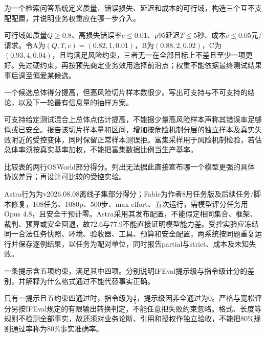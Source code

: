 \begin{exercises}
\begin{exercise}\optional 为一个检索问答系统定义质量、错误损失、延迟和成本的可行域，构造三个互不支配配置，并说明业务权重应在哪一步介入。

\begin{solution}
可行域如质量$Q\ge0.8$、高损失错误率$e\le0.01$、p95延迟$T\le5$秒、成本$c\le0.05$元/请求。令A为$(Q,T,c)=(0.82,1,0.01)$，B为$(0.88,2,0.02)$，C为$(0.93,4,0.04)$，且均满足风险约束，三者无一在全部目标上不差且至少一项更好。先过硬约束，再按预先商定业务效用选择前沿点；权重不能依据最终测试结果事后调至偏爱某候选。
\end{solution}
\end{exercise}

\begin{exercise} 一个候选总体得分提高，但高风险切片样本数很少。写出可支持与不可支持的结论，以及下一轮最有信息量的抽样方案。

\begin{solution}
可支持给定测试混合上总体点估计提高，不能据少量高风险样本声称其错误率足够低或已安全。报告该切片样本量和区间，增加按危险机制分层的独立样本及真实失败附近的受控变体，同时保留正常样本测误拒。富集采样用于风险机制检验，若估总体率须按真实基率加权，不能把富集数据比例当生产基率。
\end{solution}
\end{exercise}

\begin{exercise} 比较表的两行OSWorld部分得分。列出无法据此直接宣布哪一个模型更强的具体协议差异；再设计可比较的受控实验。

\begin{solution}
Astra行为为v2026.08.08离线子集部分得分；Fable为作者8月任务版及后续任务/脚本修复，108任务、1080p、500步、max effort、五次运行，需模型评分任务用Opus 4.8，且安全干预计零。Astra采用其发布配置，不能假定相同集合、框架、裁判、预算或安全回退，故72.6与77.9不能直接证明模型能力差。受控实验应冻结同一合法任务快照、环境、验收器、工具、预算和安全配置，两系统按同题重复运行并保存逐例结果，以任务为配对单位，同时报告partial与strict、成本及未知失败。
\end{solution}
\end{exercise}

\begin{exercise} 一条提示含五项约束，满足其中四项。分别说明IFEval提示级与指令级计分的差别，并解释为什么格式通过不能代替事实正确。

\begin{solution}
只有一提示且五约束四通过时，指令级为$\frac{4}{5}$，提示级因非全通过为0。严格与宽松评分另按IFEval规定的有限输出转换判定，不能任意把失败约束忽略。格式、长度等规则不检测全部事实，故还须对业务论断、引用和授权作独立验收，不能把80\%规则通过率称为80\%事实准确率。
\end{solution}
\end{exercise}


\end{exercises}
